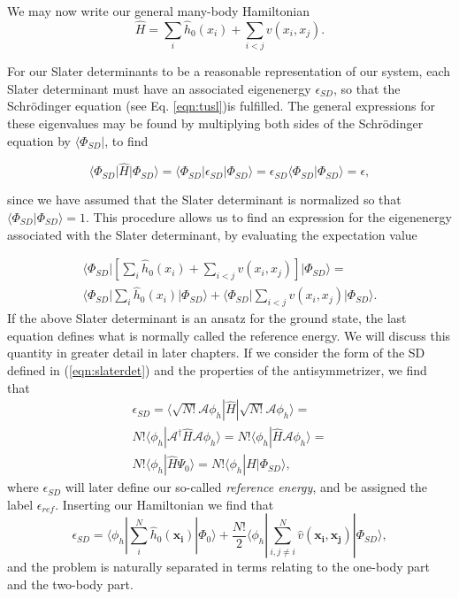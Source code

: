 We may now write our general many-body Hamiltonian
\begin{equation}
\hat{H} = \sum_i \hat{h}_0(x_i) + \sum_{i<j} v(x_i, x_j).
\label{eqn:general_hamiltonian}
\end{equation}

For our Slater determinants to be a reasonable representation of our system, each Slater determinant must have an associated eigenenergy $\epsilon_{SD}$, so that the Schrödinger equation (see Eq. \ref{eqn:tusl})is fulfilled. The general expressions for these eigenvalues may be found by multiplying both sides of the Schrödinger equation by $\langle \Phi_{SD} \vert$, to find

\begin{equation}
\langle \Phi_{SD} \vert \hat{H} \vert \Phi_{SD} \rangle = \langle \Phi_{SD} \vert \epsilon_{SD} \vert \Phi_{SD} \rangle = \epsilon_{SD}  \langle \Phi_{SD} \vert \Phi_{SD} \rangle = \epsilon,
\label{eqn:refee}
\end{equation}

since we have assumed that the Slater determinant is normalized so that $\langle \Phi_{SD} \vert \Phi_{SD} \rangle = 1$. This procedure allows us to find an expression for the eigenenergy associated with the Slater determinant, by evaluating the expectation value

\begin{multline}
\langle \Phi_{SD}  \vert [\sum_i \hat{h}_0(x_i) + \sum_{i<j} v(x_i, x_j)] \vert \Phi_{SD} \rangle = \\
 \langle \Phi_{SD} \vert   \sum_i \hat{h}_0(x_i) \vert \Phi_{SD} \rangle + \langle \Phi_{SD} \vert  \sum_{i<j} v(x_i, x_j) \vert \Phi_{SD} \rangle.
\label{eqn:TUSL_sol2}
\end{multline}
If the above Slater determinant is an ansatz for the ground state, the last equation defines what is normally called the reference energy. We will discuss this quantity in greater detail in later chapters.
If we consider the form of the SD defined in (\ref{eqn:slaterdet}) and the properties of the antisymmetrizer, we find that
\begin{multline}
    \epsilon_{SD} = \langle \sqrt{N!} \mathcal{A} \phi _h | \hat{H} | \sqrt{N!} \mathcal{A} \phi _h \rangle = \\
    N!\langle \phi _h | \mathcal{A}^{\dagger} \hat{H} \mathcal{A} \phi _h \rangle = N!\langle \phi _h | \hat{H}\mathcal{A}\phi _h \rangle = \\ 
    N!\langle \phi _h |\hat{H} \Psi _0 \rangle  = N!\langle \phi _h |\hat{H} | \Phi _{SD} \rangle, 
 \label{eqn:groundstate}
\end{multline}
where $\epsilon_{SD}$ will later define our so-called \emph{reference energy}, and be assigned the label $\epsilon_{ref}$. 
Inserting our Hamiltonian we find that
\begin{equation}
\epsilon _{SD} = \langle \phi _h | \sum _i^N \hat{h}_0(\mathbf{x_i}) | \Phi _0\rangle + \frac{N!}{2}\langle \phi _h | \sum _{i,j\neq i}^N \hat{v}(\mathbf{x_i}, \mathbf{x_j}) | \Phi _{SD} \rangle,
 \label{eqn:convinient_groundstate}
\end{equation}
and the problem is naturally separated in terms relating to the one-body 
part and the two-body part. 

